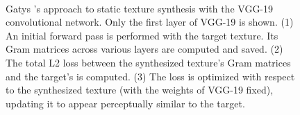 \begin{figure}[t]
\begin{center}
	\\
	\caption[Static texture synthesis with a convolutional network]{Gatys \etal's \cite{gatys2015} approach to static texture synthesis with the VGG-19 \cite{simonyan2014very} convolutional network. Only the first layer of VGG-19 is shown. (1) An initial forward pass is
performed with the target texture. Its Gram matrices
across various layers are computed and saved. (2) The total L2 loss between the synthesized texture's Gram matrices and the target's is computed. (3) The loss is optimized with respect to the synthesized texture (with the weights of VGG-19 fixed), updating it to appear perceptually similar to the target.}
	\vspace{-0.65cm}
	\label{fig:vgg_texture_synthesis}
\end{center}
\end{figure}